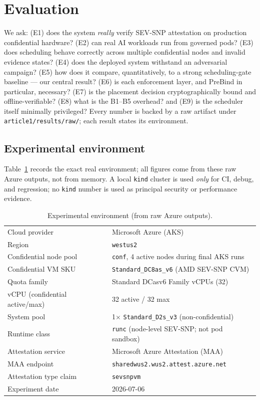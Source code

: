 \section{Evaluation}
\label{sec:evaluation}

We ask: (E1) does the system \emph{really} verify SEV-SNP attestation on
production confidential hardware? (E2) can real AI workloads run from governed
pods? (E3) does scheduling behave correctly across multiple confidential nodes
and invalid evidence states? (E4) does the deployed system withstand an
adversarial campaign? (E5) how does it compare, quantitatively, to a strong
scheduling-gate baseline --- our central result? (E6) is each enforcement layer,
and PreBind in particular, necessary? (E7) is the placement decision
cryptographically bound and offline-verifiable? (E8) what is the B1--B5 overhead?
and (E9) is the scheduler itself minimally privileged? Every number is backed by
a raw artifact under \texttt{article1/results/raw/}; each result states its
environment.

\subsection{Experimental environment}
Table~\ref{tab:env} records the exact real environment; all figures come from
these raw Azure outputs, not from memory. A local \texttt{kind} cluster is used
\emph{only} for CI, debug, and regression; no \texttt{kind} number is used as
principal security or performance evidence.

\begin{table}[t]
  \centering
  \caption{Experimental environment (from raw Azure outputs).}
  \label{tab:env}
  \footnotesize
  \begin{tabular}{@{}ll@{}}
    \toprule
    Cloud provider & Microsoft Azure (AKS) \\
    Region & \texttt{westus2} \\
    Confidential node pool & \texttt{conf}, 4 active nodes during final AKS runs \\
    Confidential VM SKU & \texttt{Standard\_DC8as\_v6} (AMD SEV-SNP CVM) \\
    Quota family & Standard DCasv6 Family vCPUs (32) \\
    vCPU (confidential active/max) & 32 active / 32 max \\
    System pool & 1$\times$ \texttt{Standard\_D2s\_v3} (non-confidential) \\
    Runtime class & \texttt{runc} (node-level SEV-SNP; not pod sandbox) \\
    Attestation service & Microsoft Azure Attestation (MAA) \\
    MAA endpoint & \texttt{sharedwus2.wus2.attest.azure.net} \\
    Attestation type claim & \texttt{sevsnpvm} \\
    Experiment date & 2026-07-06 \\
    \bottomrule
  \end{tabular}
\end{table}

